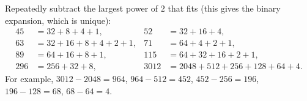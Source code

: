 Repeatedly subtract the largest power of $2$ that fits (this gives the binary expansion, which is unique):
\begin{align*}
45&=32+8+4+1, & 52&=32+16+4,\\
63&=32+16+8+4+2+1, & 71&=64+4+2+1,\\
89&=64+16+8+1, & 115&=64+32+16+2+1,\\
296&=256+32+8, & 3012&=2048+512+256+128+64+4.
\end{align*}
For example, $3012-2048=964$, $964-512=452$, $452-256=196$, $196-128=68$, $68-64=4$.
